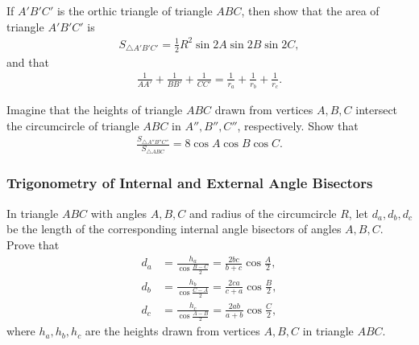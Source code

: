 \begin{question}
    If $A'B'C'$ is the orthic triangle of triangle $ABC$, then show that the area of triangle $A'B'C'$ is
    \begin{align*}
        S_{\triangle A'B'C'} = \frac{1}{2} R^2 \sin 2A \sin 2B \sin 2C,
    \end{align*}
    and that
    \begin{align*}
        \frac{1}{AA'} + \frac{1}{BB'} + \frac{1}{CC'} = \frac{1}{r_a} + \frac{1}{r_b} + \frac{1}{r_c}.
    \end{align*}
\end{question}


\begin{question}
    Imagine that the heights of triangle $ABC$ drawn from vertices $A,B,C$ intersect the circumcircle of triangle $ABC$ in $A'', B'', C''$, respectively. Show that
    \begin{align*}
        \displaystyle \frac{S_{\triangle A''B''C''}}{S_{\triangle ABC}} = 8\cos A \cos B \cos C.
    \end{align*}
\end{question}



\subsubsection{Trigonometry of Internal and External Angle Bisectors}

\begin{tcolorbox}
    \begin{question}[name=Calculating the Length of Internal Angle Bisectors]
        In triangle $ABC$ with angles $A,B,C$ and radius of the circumcircle $R$, let $d_a,d_b,d_c$ be the length of the corresponding internal angle bisectors of angles $A,B,C$. Prove that
        \begin{align*}
            d_a &=\displaystyle \frac{h_a}{\displaystyle\cos\frac{B-C}{2}} = \frac{2bc}{b+c}\cos\frac{A}{2},\\
            d_b &=\displaystyle \frac{h_b}{\displaystyle\cos\frac{C-A}{2}}= \frac{2ca}{c+a}\cos\frac{B}{2},\\
            d_c &=\displaystyle \frac{h_c}{\displaystyle\cos\frac{A-B}{2}}= \frac{2ab}{a+b}\cos\frac{C}{2},
        \end{align*}
        where $h_a,h_b,h_c$ are the heights drawn from vertices $A,B,C$ in triangle $ABC$.
    \end{question}
\end{tcolorbox}


